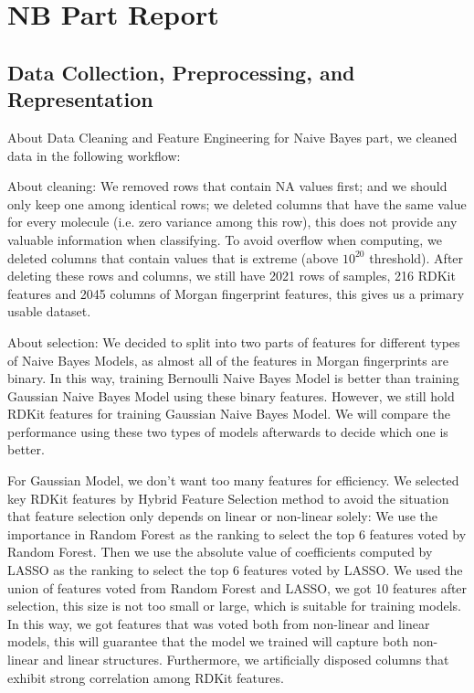 \documentclass{article}
\begin{document}
\section{NB Part Report}

\subsection{Data Collection, Preprocessing, and Representation}

About Data Cleaning and Feature Engineering for Naive Bayes part, we cleaned data in the following workflow:

About cleaning: We removed rows that contain NA values first; and we should only keep one among identical rows; we deleted columns that have the same value for every molecule (i.e. zero variance among this row), this does not provide any valuable information when classifying. To avoid overflow when computing, we deleted columns that contain values that is extreme (above $10^{20}$ threshold). After deleting these rows and columns, we still have 2021 rows of samples, 216 RDKit features and 2045 columns of Morgan fingerprint features, this gives us a primary usable dataset.

About selection: We decided to split into two parts of features for different types of Naive Bayes Models, as almost all of the features in Morgan fingerprints are binary. In this way, training Bernoulli Naive Bayes Model is better than training Gaussian Naive Bayes Model using these binary features. However, we still hold RDKit features for training Gaussian Naive Bayes Model. We will compare the performance using these two types of models afterwards to decide which one is better. 

For Gaussian Model, we don’t want too many features for efficiency. We selected key RDKit features by Hybrid Feature Selection method to avoid the situation that feature selection only depends on linear or non-linear solely: We use the importance in Random Forest as the ranking to select the top 6 features voted by Random Forest. Then we use the absolute value of coefficients computed by LASSO as the ranking to select the top 6 features voted by LASSO. We used the union of features voted from Random Forest and LASSO, we got 10 features after selection, this size is not too small or large, which is suitable for training models. In this way, we got features that was voted both from non-linear and linear models, this will guarantee that the model we trained will capture both non-linear and linear structures. Furthermore, we artificially disposed columns that exhibit strong correlation among RDKit features.
\end{document}
